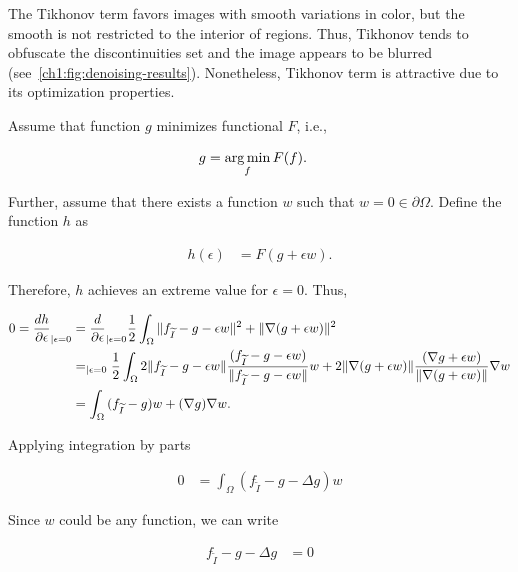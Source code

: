 The Tikhonov term favors images with smooth variations in color, but the smooth is not restricted to the interior of regions. Thus, Tikhonov tends to obfuscate the discontinuities set and the image appears to be blurred (see~\cref{ch1:fig:denoising-results}). Nonetheless, Tikhonov term is attractive due to its optimization properties.

Assume that function $g$ minimizes functional $F$, i.e.,

\begin{align*}
	g &= \operatorname*{arg\,min}_{f}{F(f)}.
\end{align*}

Further, assume that there exists a function $w$ such that $w=0 \in \partial \Omega$. Define the function $h$ as

\begin{align*}
	h(\epsilon) &= F(g+\epsilon w).
\end{align*}

Therefore, $h$ achieves an extreme value for $\epsilon=0$. Thus,

\begin{align*}
	0 = \frac{dh}{\partial \epsilon}_{| \epsilon=0} &= \frac{d}{\partial \epsilon}_{| \epsilon=0} \frac{1}{2} \int_{\Omega}{ \lVert f_{\widetilde{I}} - g - \epsilon w\rVert^2 + \lVert \nabla (g + \epsilon w) \rVert^2} \\
	&= _{| \epsilon = 0} \frac{1}{2} \int_{\Omega}{ 2\lVert f_{\widetilde{I}} - g - \epsilon w\rVert\frac{(f_{\widetilde{I}} - g - \epsilon w) }{\lVert f_{\widetilde{I}} - g - \epsilon w\rVert}w + 2\lVert \nabla (g + \epsilon w) \rVert\frac{(\nabla g + \epsilon w)}{\lVert \nabla (g + \epsilon w) \rVert}\nabla w} \\
	&= \int_{\Omega}{ (f_{\widetilde{I}} - g)w + (\nabla g)\nabla w}. 	
\end{align*}

Applying integration by parts

\begin{align*}
		0 &= \int_{\Omega} ( f_{\widetilde{I}} - g - \Delta g )w
\end{align*}

Since $w$ could be any function, we can write

\begin{align}
	f_{\widetilde{I}} - g - \Delta g &= 0
	\label{ch1:eq:variational-necessary-condition}
\end{align}


